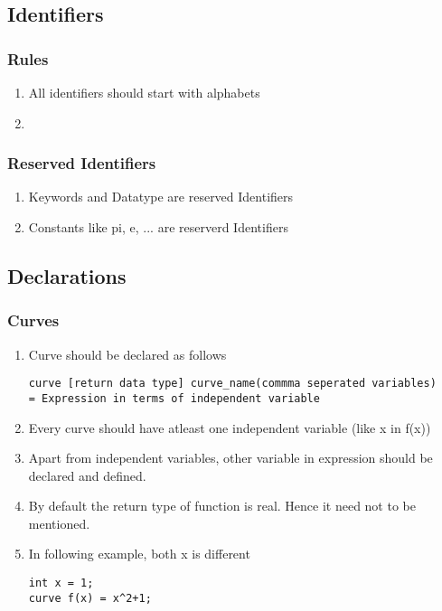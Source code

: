 \documentclass[12pt]{article}
\begin{document}
    \subsection{Identifiers}
    \subsubsection{Rules}
    \begin{enumerate}
        \item All identifiers should start with alphabets
        \item 
    \end{enumerate}
    \subsubsection{Reserved Identifiers}
    \begin{enumerate}
        \item Keywords and Datatype are reserved Identifiers
        \item Constants like pi, e, ... are reserverd Identifiers
    \end{enumerate}
    \subsection{Declarations}
    \subsubsection{Curves}
    \begin{enumerate}
        \item Curve should be declared as follows
        \begin{verbatim}
curve [return data type] curve_name(commma seperated variables) 
= Expression in terms of independent variable
        \end{verbatim}
        \item Every curve should have atleast one independent variable (like x in f(x))
        \item Apart from independent variables, other variable in expression should be declared and defined.
        \item By default the return type of function is real. Hence it need not to be mentioned.
        \item In following example, both x is different
        \begin{verbatim}
int x = 1;
curve f(x) = x^2+1;
        \end{verbatim}
    \end{enumerate}
\end{document}
